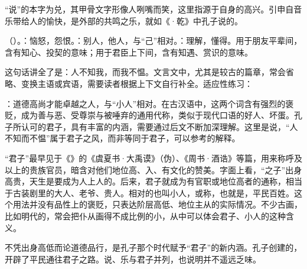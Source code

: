 {“说”的本字为兑，其甲骨文字形像人咧嘴而笑，这里指源于自身的高兴。引申自音乐带给人的愉快，是外部的共鸣之乐，就如《·乾》中孔子说的。

\item {}（）。：恼怒，怨恨。：别人，他人，与“己”相对。：理解，懂得。用于朋友平辈间，含有知心、投契的意味；用于君臣上下间，含有知遇、赏识的意味。

这句话讲全了是：人不知我，而我不愠。文言文中，尤其是较古的篇章，常会省略、变换主语或宾语，需要读者根据上下文自行补全。适应性练习：   

\item {}：道德高尚才能卓越之人，与“小人”相对。在古汉语中，这两个词含有强烈的褒贬，成为善与恶、受尊崇与被唾弃的通用代称，类似于现代口语的好人、坏蛋。孔子所认可的君子，具有丰富的内涵，需要通过后文不断加深理解。这里是说，“人不知而不愠”属于君子之风，而非等同于君子，可以参考的解释。

“君子”最早见于《》的《虞夏书·大禹谟》（伪）、《周书·酒诰》等篇，用来称呼及以上的贵族官员，暗含对他们地位高、入、有文化的赞美。字面上看，“之子”出身高贵，天生是要成为人上人的。后来，君子就成为有官职或地位高者的通称，相当于古装剧里的大人、老爷、贵人。相对的也叫小人，或称，也就是，平民百姓。这个用法并没有品性上的褒贬，只表达阶层高低、地位主从的实际情况。不少古画，比如明代的，常会把仆从画得不成比例的小，从中可以体会君子、小人的这种含义。

不凭出身高低而论道德品行，是孔子那个时代赋予“君子”的新内涵。孔子创建的，开辟了平民通往君子之路。说、乐与君子并列，也说明并不遥远乏味。
}
